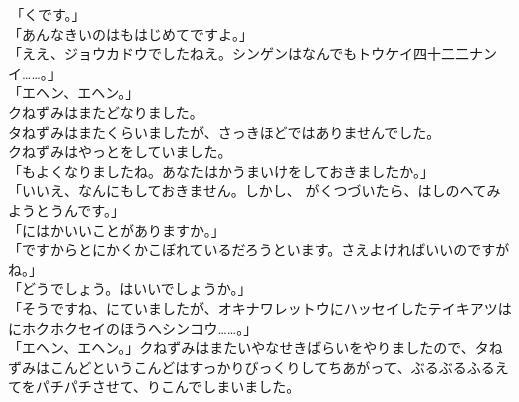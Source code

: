 \documentclass[
    a4paper,
    10pt,
    book]
    {tarticle}
\begin{document}
\noindent \,「くです。」\\
「あんなきいのはもはじめてですよ。」\\
「ええ、ジョウカドウでしたねえ。シンゲンはなんでもトウケイ四十二二ナンイ……。」\\
「エヘン、エヘン。」\\
\indent クねずみはまたどなりました。\\
\indent タねずみはまたくらいましたが、さっきほどではありませんでした。\\
\indent クねずみはやっとをしていました。\\
「もよくなりましたね。あなたはかうまいけをしておきましたか。」\\
「いいえ、なんにもしておきません。しかし、 がくつづいたら、はしのへてみようとうんです。」\\
「にはかいいことがありますか。」\\
「ですからとにかくかこぼれているだろうといます。さえよければいいのですがね。」\\
「どうでしょう。はいいでしょうか。」\\
「そうですね、にていましたが、オキナワレットウにハッセイしたテイキアツはにホクホクセイのほうへシンコウ……。」\\
「エヘン、エヘン。」クねずみはまたいやなせきばらいをやりましたので、タねずみはこんどというこんどはすっかりびっくりしてちあがって、ぶるぶるふるえてをパチパチさせて、りこんでしまいました。

\newpage
\thispagestyle{fancy}
\end{document}
